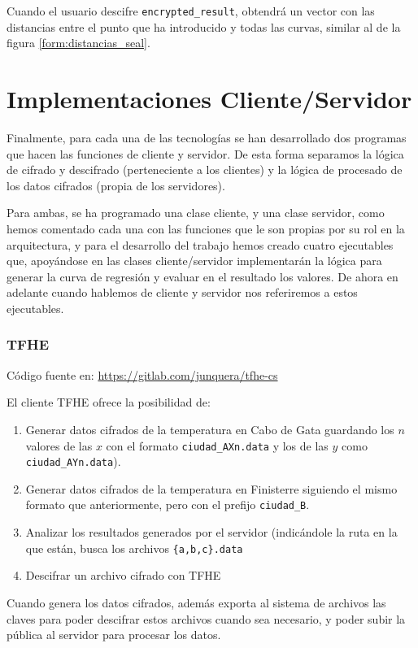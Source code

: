Cuando el usuario descifre \verb|encrypted_result|, obtendrá un vector con las distancias entre el punto que ha introducido y todas las curvas, similar al de la figura \ref{form:distancias_seal}.

\section{Implementaciones Cliente/Servidor}

Finalmente, para cada una de las tecnologías se han desarrollado dos programas que hacen las funciones de cliente y servidor. De esta forma separamos la lógica de cifrado y descifrado (perteneciente a los clientes) y la lógica de procesado de los datos cifrados (propia de los servidores).

Para ambas, se ha programado una clase cliente, y una clase servidor, como hemos comentado cada una con las funciones que le son propias por su rol en la arquitectura, y para el desarrollo del trabajo hemos creado cuatro ejecutables que, apoyándose en las clases cliente/servidor implementarán la lógica para generar la curva de regresión y evaluar en el resultado los valores. De ahora en adelante cuando hablemos de cliente y servidor nos referiremos a estos ejecutables.

\subsubsection{TFHE}

Código fuente en: \url{https://gitlab.com/junquera/tfhe-cs}

El cliente TFHE ofrece la posibilidad de:

\begin{enumerate}
    \item Generar datos cifrados de la temperatura en Cabo de Gata guardando los $n$ valores de las $x$ con el formato \verb|ciudad_AXn.data| y los de las $y$ como  \verb|ciudad_AYn.data|).
    \item Generar datos cifrados de la temperatura en Finisterre siguiendo el mismo formato que anteriormente, pero con el prefijo \verb|ciudad_B|.
    \item Analizar los resultados generados por el servidor (indicándole la ruta en la que están, busca los archivos \verb|{a,b,c}.data|
    \item Descifrar un archivo cifrado con TFHE
\end{enumerate}{}

Cuando genera los datos cifrados, además exporta al sistema de archivos las claves para poder descifrar estos archivos cuando sea necesario, y poder subir la pública al servidor para procesar los datos.

